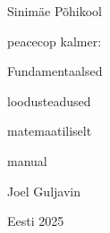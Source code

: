 \begin{titlepage}
\par{Sinimäe Põhikool}
\vspace{0.3\textheight}
\par{peacecop kalmer:}
\LARGE
\par{Fundamentaalsed}
\par{loodusteadused}
\par{matemaatiliselt}
\normalsize
\par{manual}
\vspace{0.3\textheight}
\begin{flushright}
\par{Joel Guljavin}
\end{flushright}
\vfill
Eesti
\hfill
2025
\end{titlepage}
